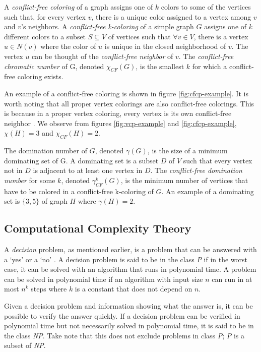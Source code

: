 \documentclass{sig-alternate}
\begin{document}
A \emph{conflict-free coloring} of a graph assigns one of $k$ colors to some of the vertices such that, for every vertex $v$, there is a unique color assigned to a vertex among $v$ and $v$'s neighbors. A \emph{conflict-free k-coloring} of a simple graph $G$ assigns one of $k$ different colors to a subset $S \subseteq V$ of vertices such that $\forall v \in V$, there is a vertex $u \in N(v)$ where the color of $u$ is unique in the closed neighborhood of $v$. The vertex $u$ can be thought of the \emph{conflict-free neighbor} of $v$. The \emph{conflict-free chromatic number} of G, denoted $\chi_{CF}(G)$, is the smallest $k$ for which a conflict-free coloring exists. \cite{abel2017three}

An example of a conflict-free coloring is shown in figure \ref{fig:cfcp-example}. It is worth noting that all proper vertex colorings are also conflict-free colorings. This is because in a proper vertex coloring, every vertex is its own conflict-free neighbor \cite{abel2017three}. We observe from figures \ref{fig:vcp-example} and \ref{fig:cfcp-example}, $\chi(H) = 3$ and $\chi_{CF}(H) = 2$.

The domination number of $G$, denoted $\gamma(G)$, is the size of a minimum dominating set of G. A dominating set is a subset $D$ of $V$ such that every vertex not in $D$ is adjacent to at least one vertex in $D$. The \emph{conflict-free domination number} for some $k$, denoted $\gamma_{CF}^k(G)$, is the minimum number of vertices that have to be colored in a conflict-free k-coloring of $G$. An example of a dominating set is $\{3, 5\}$ of graph $H$ where $\gamma(H) = 2$.

\subsection{Computational Complexity Theory}
\label{sec:complexitytheory}
A \emph{decision} problem, as mentioned earlier, is a problem that can be answered with a `yes' or a `no' \cite{sipser2006introduction}. A decision problem is said to be in the class \emph{P} if in the worst case, it can be solved with an algorithm that runs in polynomial time. A problem can be solved in polynomial time if an algorithm with input size $n$ can run in at most $n^k$ steps where $k$ is a constant that does not depend on $n$.

Given a decision problem and information showing what the answer is, it can be possible to verify the answer quickly. If a decision problem can be verified in polynomial time but not necessarily solved in polynomial time, it is said to be in the class \emph{NP}. Take note that this does not exclude problems in class \emph{P}; \emph{P} is a subset of \emph{NP}.
\end{document}
